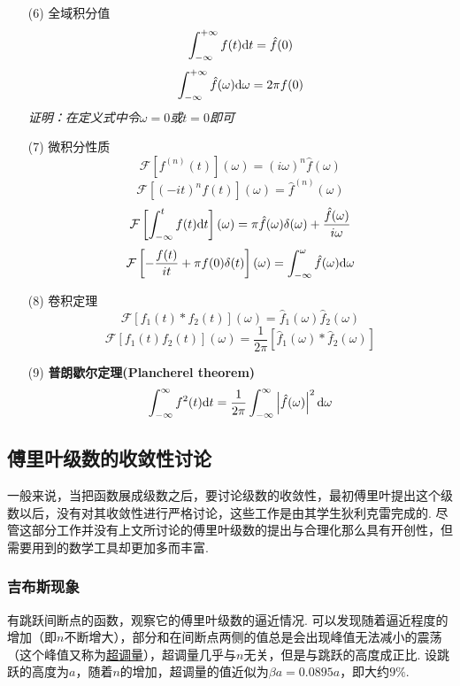 \documentclass[UTF8]{ctexart}
\newcommand{\trm}[1]{{\rm #1}}
\begin{document}
\begin{itemize}
    \item [(6)] 全域积分值
    \[ \int_{-\infty}^{+\infty}f(t)\trm{d}t = \hat{f}(0)\]
    \[ \int_{-\infty}^{+\infty}\hat{f}(\omega)\trm{d}\omega = 2\pi f(0)\]
    \textit{证明：在定义式中令\(\omega=0\)或\(t=0\)即可}
    \item [(7)] 微积分性质
    \[ \mathcal{F}\left[f^{(n)}(t)\right](\omega) = (i\omega)^n \hat{f}(\omega) \]
    \[ \mathcal{F}\left[(-it)^nf(t)\right](\omega) = \hat{f}^{(n)}(\omega)\]
    \[ \mathcal{F}\left[\int_{-\infty}^t f(t)\trm{d}t\right](\omega) = \pi \hat{f}(\omega)\delta(\omega)+\frac{\hat{f}(\omega)}{i\omega}\]
    \[ \mathcal{F}\left[-\frac{f(t)}{it}+\pi f(0)\delta(t)\right](\omega) = \int_{-\infty}^\omega \hat{f}(\omega)\trm{d}\omega\]
    \item [(8)] 卷积定理
    \[ \mathcal{F}\left[f_1(t)*f_2(t)\right](\omega) = \hat{f}_1(\omega)\hat{f}_2(\omega)\]
    \[ \mathcal{F}\left[f_1(t)f_2(t)\right](\omega) = \frac{1}{2\pi}[\hat{f}_1(\omega) * \hat{f}_2(\omega)]\]
    \item [(9)] \textbf{普朗歇尔定理(Plancherel theorem)}
    \[\int_{-\infty}^{\infty}f^2(t)\trm{d}t = \frac{1}{2\pi}\int_{-\infty}^{\infty}\left|\hat{f}(\omega)\right|^2\trm{d}\omega\]
\end{itemize}

\subsection{傅里叶级数的收敛性讨论}

一般来说，当把函数展成级数之后，要讨论级数的收敛性，最初傅里叶提出这个级数以后，没有对其收敛性进行严格讨论，这些工作是由其学生狄利克雷完成的. 尽管这部分工作并没有上文所讨论的傅里叶级数的提出与合理化那么具有开创性，但需要用到的数学工具却更加多而丰富.

\subsubsection{吉布斯现象}

有跳跃间断点的函数，观察它的傅里叶级数的逼近情况. 
可以发现随着逼近程度的增加（即\(n\)不断增大），部分和在间断点两侧的值总是会出现峰值无法减小的震荡（这个峰值又称为\uline{超调量}），超调量几乎与\(n\)无关，但是与跳跃的高度成正比. 设跳跃的高度为\(a\)，随着\(n\)的增加，超调量的值近似为\(\beta a=0.0895a\)，即大约\(9\%\).
\end{document}
